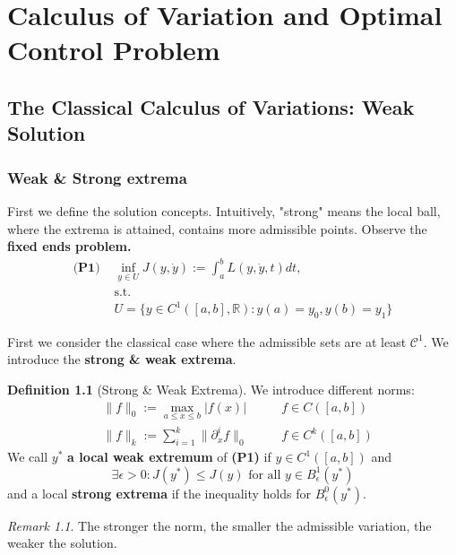 \documentclass[a4paper,11pt,fleqn]{book}
\theoremstyle{definition}
\newtheorem{definition}{Definition}[section]
\theoremstyle{remark}
\newtheorem*{remark}{Remark}
\begin{document}
\chapter{Calculus of Variation and Optimal Control Problem}
\section{The Classical Calculus of Variations: Weak Solution}
\subsection{Weak \& Strong extrema}
First we define the solution concepts. Intuitively, "strong" means the local ball, where the extrema is attained, contains more admissible points. 
Observe the \textbf{fixed ends problem.}
\begin{equation}
\begin{aligned}
	\textbf{(P1) }& \inf_{y \in U} J(y, \dot{y}):= \int_a^b L(y, \dot{y}, t) dt,  \\
	& \text{s.t.}\\
	& U = \{y \in C^1([a, b], \mathbb{R}) : y(a) = y_0, y(b) = y_1\}
\end{aligned}
\end{equation}

First we consider the classical case where the admissible sets are at least $\mathcal{C}^1$. We introduce the \textbf{strong \& weak extrema}.
\begin{definition}[Strong \& Weak Extrema]	
We introduce different norms:
\begin{equation}
\begin{aligned}
	& \|f\|_0:= \max_{a \le x \le b} |f(x)| \qquad &f \in C([a, b])\\
	& \|f\|_k:= \sum_{i = 1}^k \|\partial_x^i f\|_0 \quad &f \in C^k([a, b])
\end{aligned}
\end{equation}
	We call $y^*$ \textbf{a local weak extremum} of \textbf{(P1)} if $y \in C^1([a, b])$ and
	\begin{equation}
		\exists \epsilon > 0: J(y^*) \le J(y) \text{ for all }y \in B_\epsilon^1(y^*)
	\end{equation}
	and a local \textbf{strong extrema} if the inequality holds for $ B_\epsilon^0(y^*)$.
\end{definition}
\begin{remark}
	The stronger the norm, the smaller the admissible variation, the weaker the solution. 
\end{remark}
\end{document}
